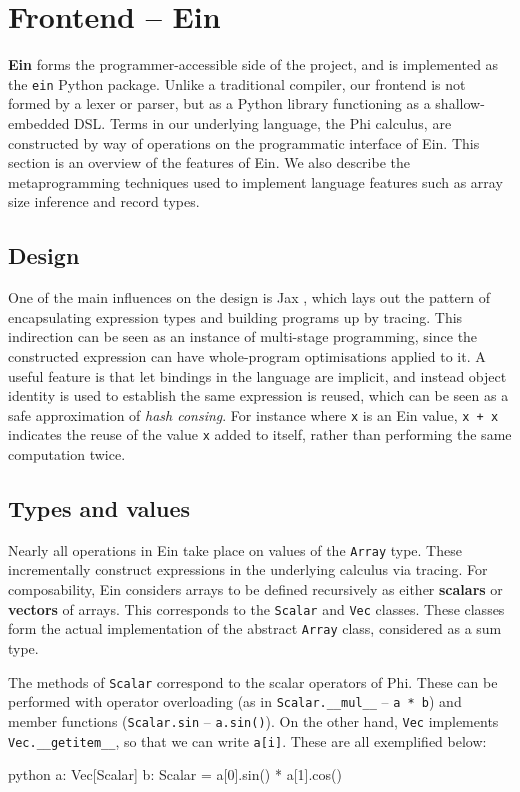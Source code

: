 \section{Frontend -- Ein}

\textbf{Ein} forms the programmer-accessible side of the project, and is implemented as the \texttt{ein} Python package. Unlike a traditional compiler, our frontend is not formed by a lexer or parser, but as a Python library functioning as a shallow-embedded DSL. Terms in our underlying language, the Phi calculus, are constructed by way of operations on the programmatic interface of Ein. This section is an overview of the features of Ein. We also describe the metaprogramming techniques used to implement language features such as array size inference and record types.

\subsection{Design}

One of the main influences on the design is Jax \cite{frostig2018compiling}, which lays out the pattern of encapsulating expression types and building programs up by tracing. This indirection can be seen as an instance of multi-stage programming, since the constructed expression can have whole-program optimisations applied to it. A useful feature is that let bindings in the language are implicit, and instead object identity is used to establish the same expression is reused, which can be seen as a safe approximation of \textit{hash consing}. For instance where \texttt{x} is an Ein value, \texttt{x + x} indicates the reuse of the value \texttt{x} added to itself, rather than performing the same computation twice.

\subsection{Types and values}

Nearly all operations in Ein take place on values of the \texttt{Array} type. These incrementally construct expressions in the underlying calculus via tracing. For composability, Ein considers arrays to be defined recursively as either \textbf{scalars} or \textbf{vectors} of arrays. This corresponds to the \texttt{Scalar} and \texttt{Vec} classes. These classes form the actual implementation of the abstract \texttt{Array} class, considered as a sum type.

The methods of \texttt{Scalar} correspond to the scalar operators of Phi. These can be performed with operator overloading (as in \texttt{Scalar.\_\_mul\_\_} -- \texttt{a * b}) and member functions (\texttt{Scalar.sin} -- \texttt{a.sin()}). On the other hand, \texttt{Vec} implements \texttt{Vec.\_\_getitem\_\_}, so that we can write \texttt{a[i]}. These are all exemplified below:
\begin{center}
\begin{cminted}{python}
a: Vec[Scalar]
b: Scalar = a[0].sin() * a[1].cos()
\end{cminted}
\end{center}

